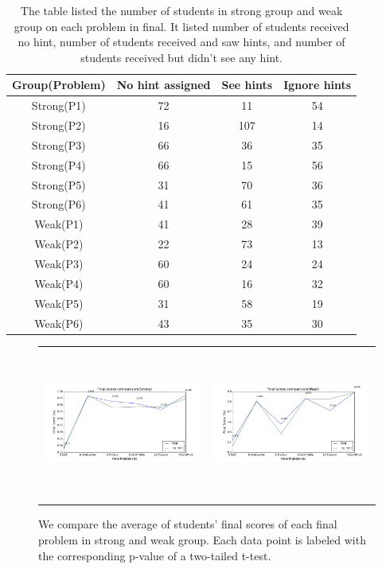 \documentclass{article} %
\begin{document}
\begin{table}[h]
\begin{center}
  \begin{tabular}{| c | c | c | c |}
  \hline
   Group(Problem) & No hint assigned & See hints & Ignore hints \\ \hline
	Strong(P1) & 72 & 11 & 54 \\
	Strong(P2) & 16 & 107 & 14 \\
    Strong(P3) & 66 & 36 & 35 \\
    Strong(P4) & 66 & 15 & 56 \\
    Strong(P5) & 31 & 70 & 36 \\
    Strong(P6) & 41 & 61 & 35 \\ \hline
    Weak(P1) & 41 & 28 & 39 \\
	Weak(P2) & 22 & 73 & 13 \\
    Weak(P3) & 60 & 24 & 24 \\
    Weak(P4) & 60 & 16 & 32 \\
    Weak(P5) & 31 & 58 & 19 \\
    Weak(P6) & 43 & 35 & 30 \\ \hline
  \end{tabular}
  \caption{The table listed the number of students in strong group and weak group on each problem in final. It listed number of students received no hint, number of students received and saw hints, and number of students received but didn't see any hint.}
  \label{tab:num_student_final_pro}
  \end{center}
\end{table}

\begin{figure}[h]
\centering
	\begin{tabular}{c c}
		\includegraphics[width=0.5\linewidth, height=5cm]{image/strong_final_compare} &
        \includegraphics[width=0.5\linewidth, height=5cm]{image/weak_final_compare}
    \end{tabular}
    \caption{We compare the average of students' final scores of each final problem in strong and weak group. Each data point is labeled with the corresponding p-value of a two-tailed t-test.}
    \label{fig:sw_final_compare}
\end{figure}
\end{document}
